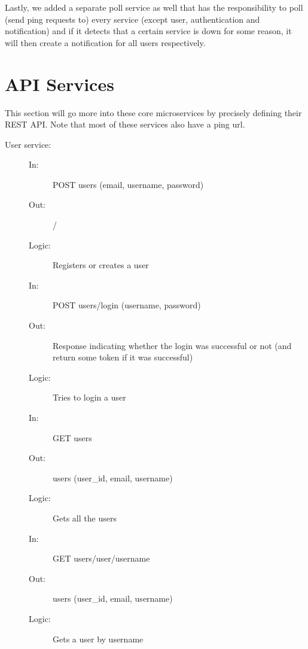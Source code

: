 \documentclass{article}
\begin{document}
Lastly, we added a separate poll service as well that has the responsibility to poll (send ping requests to) every service (except user, authentication and notification) and if it detects that a certain service is down for some reason, it will then create a notification for all users respectively.

\section{API Services}
\label{api}

This section will go more into these core microservices by precisely defining their REST API. Note that most of these services also have a ping url.

\begin{description}
    \item [User service:]
    \begin{description}
        \item[]
        \item[In:] POST users (email, username, password)
        \item[Out:] /
        \item[Logic:] Registers or creates a user
        \item[]
    \end{description}
    \begin{description}
        \item[In:] POST users/login (username, password)
        \item[Out:] Response indicating whether the login was successful or not (and return some token if it was successful)
        \item[Logic:] Tries to login a user
        \item[]
    \end{description}
    \begin{description}
        \item[In:] GET users
        \item[Out:] users (user\_id, email, username)
        \item[Logic:] Gets all the users
        \item[]
    \end{description}
    \begin{description}
        \item[In:] GET users/user/username
        \item[Out:] users (user\_id, email, username)
        \item[Logic:] Gets a user by username

\end{description}
\end{description}
\end{document}
